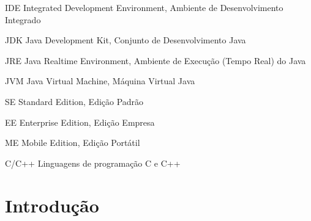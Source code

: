 \documentclass[
	12pt,				%
	twoside,			%
	a4paper,			%
	english,			%
	french,				%
	spanish,			%
	brazil				%
	]{abntex2}
\newcommand{\listofquadrosname}{Lista de quadros}
\begin{document}
\listoffigures*
\cleardoublepage


\listoftables*
\cleardoublepage

\begin{siglas}
  \item[IDE] Integrated Development Environment, Ambiente de Desenvolvimento Integrado
  \item[JDK] Java Development Kit, Conjunto de Desenvolvimento Java
  \item[JRE] Java Realtime Environment, Ambiente de Execução (Tempo Real) do Java
  \item[JVM] Java Virtual Machine, Máquina Virtual Java
  \item[SE] Standard Edition, Edição Padrão
  \item[EE] Enterprise Edition, Edição Empresa
  \item[ME] Mobile Edition, Edição Portátil
  \item[C/C++] Linguagens de programação C e C++
\end{siglas}


\tableofcontents*
\cleardoublepage



\textual

\chapter{Introdução}
\end{document}
